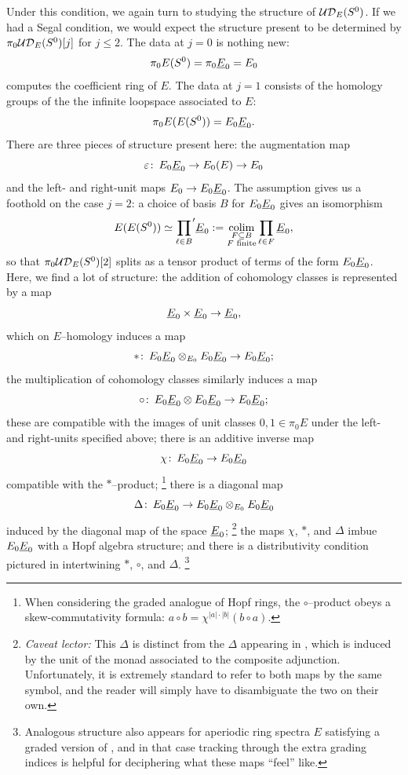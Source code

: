 Under this condition, we again turn to studying the structure of \(\mathcal{UD}_E(S^0)\).
If we had a Segal condition, we would expect the structure present to be determined by \(\pi_0 \mathcal{UD}_E(S^0)[j]\) for \(j \le 2\).
The data at \(j = 0\) is nothing new: \[\pi_0 E(S^0) = \pi_0 \OS{E}{0} = E_0\] computes the coefficient ring of \(E\).
The data at \(j = 1\) consists of the homology groups of the the infinite loopspace associated to \(E\): \[\pi_0 E(E(S^0)) = E_0 \OS{E}{0}.\]
There are three pieces of structure present here: the augmentation map \[\eps\co E_0 \OS{E}{0} \to E_0(E) \to E_0\] and the left- and right-unit maps \(E_0 \to E_0 \OS{E}{0}\).
The assumption {\UFH} gives us a foothold on the case \(j = 2\): a choice of basis \(B\) for \(E_0 \OS{E}{0}\) gives an isomorphism \[E(E(S^0)) \simeq {\prod_{\ell \in B}}' \OS{E}{0} := \colim_{\substack{F \subseteq B \\ \text{\(F\) finite}}} \prod_{\ell \in F} \OS{E}{0},\] so that \(\pi_0 \mathcal{UD}_E(S^0)[2]\) splits as a tensor product of terms of the form \(E_0 \OS{E}{0}\).
Here, we find a lot of structure: the addition of cohomology classes is represented by a map \[\OS E 0 \times \OS E 0 \to \OS E 0,\] which on \(E\)--homology induces a map \[\ast\co E_0 \OS{E}{0} \otimes_{E_0} E_0 \OS{E}{0} \to E_0 \OS{E}{0};\] the multiplication of cohomology classes similarly induces a map \[\circ\co E_0 \OS{E}{0} \otimes E_0 \OS{E}{0} \to E_0 \OS{E}{0};\] these are compatible with the images of unit classes \(0, 1 \in \pi_0 E\) under the left- and right-units specified above; there is an additive inverse map \[\chi\co E_0 \OS{E}{0} \to E_0 \OS{E}{0}\] compatible with the \(\ast\)--product;%
\footnote{%
When considering the graded analogue of Hopf rings, the \(\circ\)--product obeys a skew-commutativity formula: \(a \circ b = \chi^{|a| \cdot |b|}(b \circ a)\).
}
there is a diagonal map \[\Delta\co E_0 \OS{E}{0} \to E_0 \OS{E}{0} \otimes_{E_0} E_0 \OS{E}{0}\] induced by the diagonal map of the space $\OS{E}{0}$;%
\footnote{%
\emph{Caveat lector:} This $\Delta$ is distinct from the $\Delta$ appearing in , which is induced by the unit of the monad associated to the composite adjunction.
Unfortunately, it is extremely standard to refer to both maps by the same symbol, and the reader will simply have to disambiguate the two on their own.
}
the maps \(\chi\), \(\ast\), and \(\Delta\) imbue \(E_0 \OS{E}{0}\) with a Hopf algebra structure; and there is a distributivity condition pictured in  intertwining \(\ast\), \(\circ\), and \(\Delta\).%
\footnote{%
Analogous structure also appears for aperiodic ring spectra \(E\) satisfying a graded version of {\UFH}, and in that case tracking through the extra grading indices is helpful for deciphering what these maps ``feel'' like.
}

